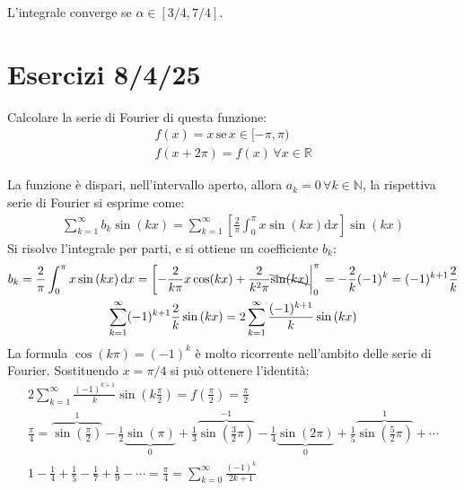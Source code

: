 \documentclass{article}
\newcommand{\df}{\mathrm{d}}
\numberwithin{equation}{subsection}
\begin{document}
L'integrale converge se $\alpha\in[3/4,7/4]$. 




\clearpage

\section{Esercizi 8/4/25}

Calcolare la serie di Fourier di questa funzione:
\begin{gather*}
    f(x)=x\,\mbox{se}\,x\in[-\pi,\pi)\\
    f(x+2\pi)=f(x)\, \forall x\in\mathbb{R}
\end{gather*}


La funzione è dispari, nell'intervallo aperto, allora $a_k=0\,\forall k\in\mathbb{N}$, la rispettiva serie di Fourier si esprime come:
\begin{gather*}
    \displaystyle\sum_{k=1}^\infty b_k\sin\left(kx\right)=
    \displaystyle\sum_{k=1}^\infty\left[\frac{2}{\pi}\int_0^{\pi}x\sin\left(kx\right)\df x\right]\sin(kx)
\end{gather*}
Si risolve l'integrale per parti, e si ottiene un coefficiente $b_k$:
\begin{gather*}
    b_k=\frac{2}{\pi}\int_0^{\pi}x\sin\left(kx\right)\df x=\left[-\frac{2}{k\pi}x\cos(kx)+\frac{2}{k^2\pi}\bcancel{\sin(kx)}\bigg|_0^\pi\right.=-\frac{2}{k}(-1)^k=(-1)^{k+1}\frac{2}{k}\\
    \displaystyle\sum_{k=1}^\infty (-1)^{k+1}\frac{2}{k}\sin\left(kx\right)=
    2\sum_{k=1}^\infty \frac{(-1)^{k+1}}{k}\sin\left(kx\right)
\end{gather*}
La formula $\cos(k\pi)=(-1)^k$ è molto ricorrente nell'ambito delle serie di Fourier. Sostituendo $x=\pi/4$ si può ottenere l'identità:
\begin{gather*}
    2\sum_{k=1}^\infty \frac{(-1)^{k+1}}{k}\sin\left(k\frac{\pi}{2}\right)=f\left(\frac{\pi}{2}\right)=\frac{\pi}{2}\\
    \displaystyle\frac{\pi}{4}=\overbrace{\sin\left(\frac{\pi}{2}\right)}^1-\frac{1}{2}\underbrace{\sin(\pi)}_{0}+\frac{1}{3}\overbrace{\sin\left(\frac{3}{2}\pi\right)}^{-1}-\frac{1}{4}\underbrace{\sin(2\pi)}_0+\frac{1}{5}\overbrace{\sin\left(\frac{5}{2}\pi\right)}^1+\cdots\\
    \displaystyle1-\frac{1}{4}+\frac{1}{5}-\frac{1}{7}+\frac{1}{9}-\cdots=\frac{\pi}{4}=\displaystyle\sum_{k=0}^\infty\frac{(-1)^k}{2k+1}
\end{gather*}

\end{document}
